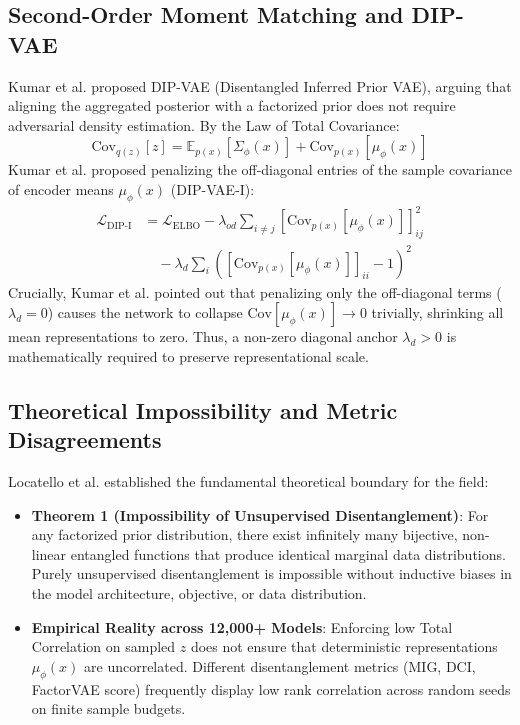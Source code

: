 \documentclass[10pt,journal,compsoc]{IEEEtran}
\begin{document}
\subsection{Second-Order Moment Matching and DIP-VAE}
Kumar et al. \cite{kumar2018variational} proposed DIP-VAE (Disentangled Inferred Prior VAE), arguing that aligning the aggregated posterior with a factorized prior does not require adversarial density estimation. By the Law of Total Covariance:
\begin{equation}
\text{Cov}_{q(z)}[z] = \mathbb{E}_{p(x)}[\Sigma_\phi(x)] + \text{Cov}_{p(x)}[\mu_\phi(x)]
\label{eq:total_cov}
\end{equation}
Kumar et al. proposed penalizing the off-diagonal entries of the sample covariance of encoder means $\mu_\phi(x)$ (DIP-VAE-I):
\begin{equation}
\begin{aligned}
\mathcal{L}_{\text{DIP-I}} &= \mathcal{L}_{\text{ELBO}} - \lambda_{od} \sum_{i \ne j} [\text{Cov}_{p(x)}[\mu_\phi(x)]]_{ij}^2 \\
&\quad - \lambda_d \sum_i ([\text{Cov}_{p(x)}[\mu_\phi(x)]]_{ii} - 1)^2
\end{aligned}
\label{eq:dip_vae}
\end{equation}
Crucially, Kumar et al. pointed out that penalizing only the off-diagonal terms ($\lambda_d = 0$) causes the network to collapse $\text{Cov}[\mu_\phi(x)] \to 0$ trivially, shrinking all mean representations to zero. Thus, a non-zero diagonal anchor $\lambda_d > 0$ is mathematically required to preserve representational scale.

\subsection{Theoretical Impossibility and Metric Disagreements}
Locatello et al. \cite{locatello2019challenging} established the fundamental theoretical boundary for the field:
\begin{itemize}
    \item \textbf{Theorem 1 (Impossibility of Unsupervised Disentanglement)}: For any factorized prior distribution, there exist infinitely many bijective, non-linear entangled functions that produce identical marginal data distributions. Purely unsupervised disentanglement is impossible without inductive biases in the model architecture, objective, or data distribution.
    \item \textbf{Empirical Reality across 12,000+ Models}: Enforcing low Total Correlation on sampled $z$ does not ensure that deterministic representations $\mu_\phi(x)$ are uncorrelated. Different disentanglement metrics (MIG, DCI, FactorVAE score) frequently display low rank correlation across random seeds on finite sample budgets.
\end{itemize}
\end{document}
